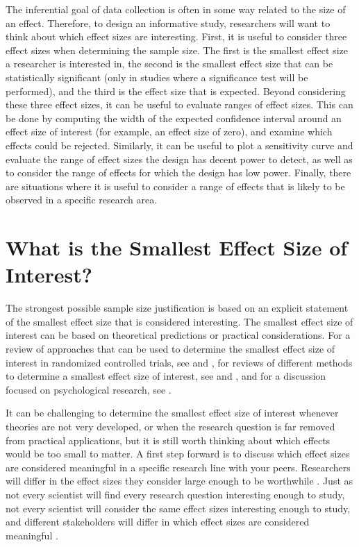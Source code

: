 \documentclass[
  oneside]{krantz}
\begin{document}
The inferential goal of data collection is often in some way related to the size of an effect. Therefore, to design an informative study, researchers will want to think about which effect sizes are interesting. First, it is useful to consider three effect sizes when determining the sample size. The first is the smallest effect size a researcher is interested in, the second is the smallest effect size that can be statistically significant (only in studies where a significance test will be performed), and the third is the effect size that is expected. Beyond considering these three effect sizes, it can be useful to evaluate ranges of effect sizes. This can be done by computing the width of the expected confidence interval around an effect size of interest (for example, an effect size of zero), and examine which effects could be rejected. Similarly, it can be useful to plot a sensitivity curve and evaluate the range of effect sizes the design has decent power to detect, as well as to consider the range of effects for which the design has low power. Finally, there are situations where it is useful to consider a range of effects that is likely to be observed in a specific research area.

\hypertarget{what-is-the-smallest-effect-size-of-interest}{%
\section{What is the Smallest Effect Size of Interest?}\label{what-is-the-smallest-effect-size-of-interest}}

The strongest possible sample size justification is based on an explicit statement of the smallest effect size that is considered interesting. The smallest effect size of interest can be based on theoretical predictions or practical considerations. For a review of approaches that can be used to determine the smallest effect size of interest in randomized controlled trials, see \citet{cook_assessing_2014} and \citet{keefe_defining_2013}, for reviews of different methods to determine a smallest effect size of interest, see \citet{king_point_2011} and \citet{copay_understanding_2007}, and for a discussion focused on psychological research, see \citet{lakens_equivalence_2018}.

It can be challenging to determine the smallest effect size of interest whenever theories are not very developed, or when the research question is far removed from practical applications, but it is still worth thinking about which effects would be too small to matter. A first step forward is to discuss which effect sizes are considered meaningful in a specific research line with your peers. Researchers will differ in the effect sizes they consider large enough to be worthwhile \citep{murphy_statistical_2014}. Just as not every scientist will find every research question interesting enough to study, not every scientist will consider the same effect sizes interesting enough to study, and different stakeholders will differ in which effect sizes are considered meaningful \citep{kelley_effect_2012}.
\end{document}
